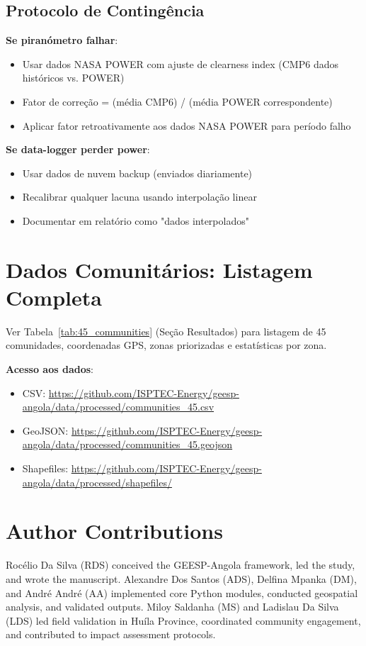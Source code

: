 \documentclass[12pt, a4paper]{article}
\begin{document}
{{{{{{{{{{{{\subsection{Protocolo de Contingência}

\textbf{Se piranómetro falhar}:
\begin{itemize}
\item Usar dados NASA POWER com ajuste de clearness index (CMP6 dados históricos vs. POWER)
\item Fator de correção = (média CMP6) / (média POWER correspondente)
\item Aplicar fator retroativamente aos dados NASA POWER para período falho
\end{itemize}

\textbf{Se data-logger perder power}:
\begin{itemize}
\item Usar dados de nuvem backup (enviados diariamente)
\item Recalibrar qualquer lacuna usando interpolação linear
\item Documentar em relatório como "dados interpolados"
\end{itemize}

\section{Dados Comunitários: Listagem Completa}
\label{app:community_data}

Ver Tabela~\ref{tab:45_communities} (Seção Resultados) para listagem de 45 comunidades, coordenadas GPS, zonas priorizadas e estatísticas por zona.

\textbf{Acesso aos dados}:
\begin{itemize}
\item CSV: \url{https://github.com/ISPTEC-Energy/geesp-angola/data/processed/communities_45.csv}
\item GeoJSON: \url{https://github.com/ISPTEC-Energy/geesp-angola/data/processed/communities_45.geojson}
\item Shapefiles: \url{https://github.com/ISPTEC-Energy/geesp-angola/data/processed/shapefiles/}
\end{itemize}

\section*{Author Contributions}
Rocélio Da Silva (RDS) conceived the GEESP-Angola framework, led the study, and wrote the manuscript. Alexandre Dos Santos (ADS), Delfina Mpanka (DM), and André André (AA) implemented core Python modules, conducted geospatial analysis, and validated outputs. Miloy Saldanha (MS) and Ladislau Da Silva (LDS) led field validation in Huíla Province, coordinated community engagement, and contributed to impact assessment protocols.

}}}}}}}}}}}}
\end{document}
